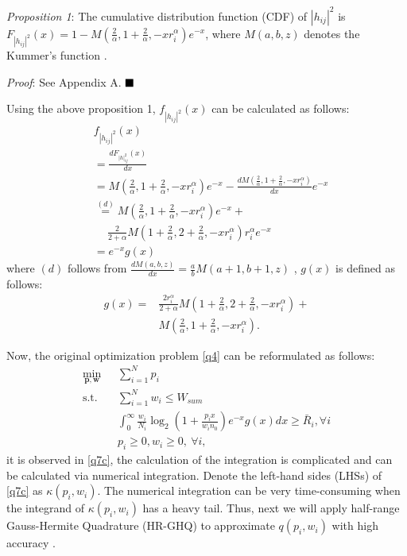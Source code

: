 \documentclass[journal]{IEEEtran}
\begin{document}
\textit{Proposition 1}: The cumulative distribution function (CDF) of $\left|h_{ij} \right|^2$ is $F_{\left|h_{ij} \right|^2}\left(x\right) = 1 - M\left(\frac{2}{\alpha}, 1 + \frac{2}{\alpha}, - x r_i^{\alpha}\right)e^{-x}$, where $M\left(a,b,z\right)$ denotes the Kummer's function \cite{MAbramowitz}.


\textit{Proof}: See Appendix A.  $\hfill\blacksquare$

Using the above proposition 1, $f_{\left|h_{ij} \right|^2} \left(x\right)$ can be calculated as follows:
\begin{align}
&f_{\left|h_{ij} \right|^2} \left(x\right)\nonumber \\ &= \frac{d F_{\left|h\right|_{ij}^2}\left(x\right)}{d x} \nonumber \\
&=M\left(\frac{2}{\alpha}, 1 + \frac{2}{\alpha}, -xr_i^{\alpha}\right)e^{-x} -\frac{d M\left(\frac{2}{\alpha}, 1 + \frac{2}{\alpha}, -x r_i^{\alpha}\right)}{d x} e^{-x} \nonumber \\
&\overset{\left(d\right)}{=} M\left(\frac{2}{\alpha}, 1 + \frac{2}{\alpha}, -xr_i^{\alpha}\right)e^{-x} + \nonumber \\ & \quad \ \frac{2}{2+\alpha}M\left(1 + \frac{2}{\alpha}, 2+\frac{2}{\alpha}, -xr_i^{\alpha}\right)r_i^{\alpha}e^{-x} \nonumber \\
& = e^{-x}g\left(x\right)
\end{align}
where $\left(d\right)$ follows from $\frac{d M\left(a, b, z\right)}{d x} = \frac{a}{b}M\left(a+1, b+1, z\right)$ \cite[13.4.8]{MAbramowitz}, $g\left(x\right)$ is defined as follows:
\begin{align}
g\left(x\right) =& \frac{2r_i^{\alpha}}{2+\alpha} M\left(1 + \frac{2}{\alpha}, 2+ \frac{2}{\alpha}, -xr_i^{\alpha}\right) + \nonumber \\ & M\left(\frac{2}{\alpha}, 1 + \frac{2}{\alpha}, -xr_i^{\alpha}\right).
\end{align}

Now, the original optimization problem \eqref{q4} can be reformulated as follows:
\begin{subequations}\label{q7}
	\begin{align}
	\min_{\mathbf{p}, \mathbf{w}}\ & \sum\limits_{i = 1}^{N} p_i \label{q7a} \\ \mbox{s.t.} \quad &  \sum\limits_{i = 1}^{N} w_i \leq W_{sum} \label{q7b} \\ \quad &  \int_{0}^{\infty} \frac{w_i}{N_i} \log_2\left(1 + \frac{p_i x}{w_i n_0}\right) e^{-x}g\left(x\right) dx \geq \bar{R}_i, \forall i \label{q7c}\\
	& p_i \geq 0, w_i \geq 0, \ \forall i, \label{q7d}
	\end{align}
\end{subequations}
it is observed in \eqref{q7c}, the calculation of the integration is complicated and can be calculated via numerical integration. Denote the left-hand sides (LHSs) of \eqref{q7c} as $\kappa\left(p_i, w_i\right)$. The numerical integration can be very time-consuming when the integrand of $\kappa\left(p_i, w_i\right)$ has a heavy tail. Thus, next we will apply half-range Gauss-Hermite Quadrature (HR-GHQ) to approximate $q\left(p_i, w_i\right)$ with high accuracy \cite{JSBall,NMSteen}.
\end{document}
